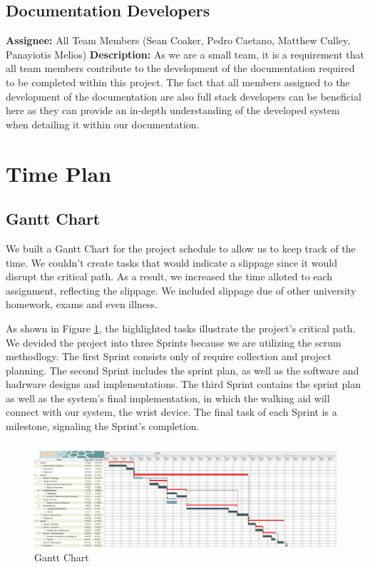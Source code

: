         \subsection{Documentation Developers}
            \textbf{Assignee: } All Team Members (Sean Coaker, Pedro Caetano, Matthew Culley, Panayiotis Melios)\newline
            \textbf{Description: } As we are a small team, it is a requirement that all team members contribute to the development of the documentation required to be completed within this project. The fact that all members assigned to the development of the documentation are also full stack developers can be beneficial here as they can provide an in-depth understanding of the developed system when detailing it within our documentation.

    \section{Time Plan}

        \subsection{Gantt Chart}
            We built a Gantt Chart for the project schedule to allow us to keep track of the time. We couldn't create tasks that
            would indicate a slippage since it would disrupt the critical path. As a result, we increased the time alloted to
            each assignment, reflecting the slippage. We included slippage due of other university homework, exams and even
            illness.

            As shown in Figure \ref{fig:gantt_chart}, the highlighted tasks illustrate the project's critical path. We devided
            the project into three Sprints because we are utilizing the scrum methodlogy. The first Sprint consists only of
            require collection and project planning. The second Sprint includes the sprint plan, as well as the software and
            hadrware designs and implementations. The third Sprint contains the sprint plan as well as the system's final
            implementation, in which the walking aid will connect with our system, the wrist device. The final task of each
            Sprint is a milestone, signaling the Sprint's completion.

            \begin{figure}[H]
              \includegraphics[width=\linewidth]{graphics/Gantt_Chart.png}
              \caption{Gantt Chart}
              \label{fig:gantt_chart}
            \end{figure}

